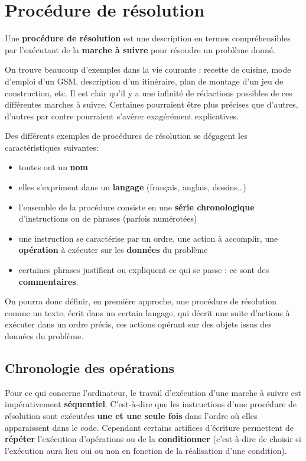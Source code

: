 \section{Procédure de résolution}

	Une \textbf{procédure de résolution }est une description en termes
	compréhensibles par l'exécutant de la \textbf{marche à
	suivre} pour résoudre un problème donné.
	
	On trouve beaucoup d'exemples dans la vie courante :
	recette de cuisine, mode d’emploi d’un GSM, description d’un
	itinéraire, plan de montage d’un jeu de construction, etc. Il est clair
	qu’il y a une infinité de rédactions possibles de ces différentes
	marches à suivre. Certaines pourraient être plus précises que d’autres,
	d’autres par contre pourraient s’avérer exagérément explicatives.
	
	Des différents exemples de procédures de résolution se dégagent les
	caractéristiques suivantes:

	\begin{itemize}
	\item toutes ont un \textbf{nom}
	\item elles s’expriment dans un \textbf{langage}
		(français, anglais, dessins…)
	\item l’ensemble de la procédure consiste 
		en une \textbf{série chronologique}
		d’instructions ou de phrases (parfois numérotées)
	\item une instruction se caractérise par un ordre, 
		une action à accomplir,
		une \textbf{opération} à exécuter sur les \textbf{données} du problème
	\item certaines phrases justifient ou expliquent ce qui se passe : 
		ce sont des \textbf{commentaires}.
	\end{itemize}

	On pourra donc définir, en première approche, une procédure de
	résolution comme un texte, écrit dans un certain langage, qui décrit
	une suite d’actions à exécuter dans un ordre précis, ces actions
	opérant sur des objets issus des données du problème.

	\subsection{Chronologie des opérations}

		Pour ce qui concerne l’ordinateur, le travail d’exécution d’une marche à
		suivre est impérativement \textbf{séquentiel}. C’est-à-dire que les
		instructions d’une procédure de résolution sont exécutées \textbf{une
		et une seule fois} dans l’ordre où elles apparaissent dans le code.
		Cependant certains artifices d’écriture permettent de \textbf{répéter}
		l’exécution d’opérations ou de la \textbf{conditionner}
		(c'est-à-dire de choisir si
		l'exécution aura lieu oui ou non en fonction de la
		réalisation d'une condition).

